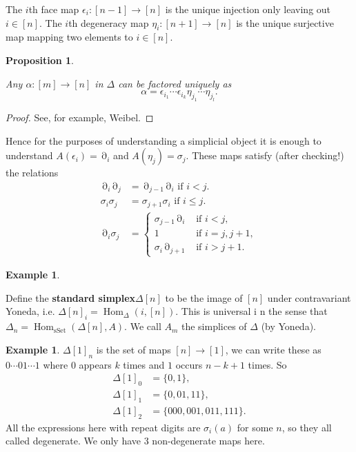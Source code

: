 \documentclass[10pt,]{book}
\newcommand{\lt}{<}
\newcommand{\gt}{>}
\newcommand{\terminology}[1]{\textbf{#1}}
\theoremstyle{plain}
\newtheorem{proposition}[theorem]{Proposition}
\theoremstyle{definition}
\newtheorem{example}[theorem]{Example}
\numberwithin{equation}{section}
\DeclareMathOperator{\Hom}{Hom}
\DeclareMathOperator{\sSet}{\text{sSet}}
\DeclareMathOperator{\dd}{\partial}
\begin{document}
          The \(i\)th face map \(\epsilon_i\colon[n-1] \to [n]\) is the unique injection only leaving out \(i \in [n]\).
          The \(i\)th degeneracy map \(\eta_i\colon [n+1] \to [n]\) is the unique surjective map mapping two elements to \(i\in [n]\).
\begin{proposition}\label{proposition-2}

            Any \(\alpha\colon [m] \to [n]\) in \(\Delta\) can be factored uniquely as
            \[
              \alpha = \epsilon_{i_1}\cdots \epsilon_{i_k}\eta_{j_1}\cdots \eta_{j_l}.
            \]\end{proposition}
\begin{proof}
See, for example, Weibel.\end{proof}
\par

          Hence for the purposes of understanding a simplicial object it is enough to understand \(A(\epsilon_i) = \dd_i\) and \(A(\eta_j) = \sigma_j\).
          These maps satisfy (after checking!) the relations
          \begin{align*}
\dd_i\dd_j &= \dd_{j-1}\dd_i \text{ if } i \lt j.\\
\sigma_i\sigma_j &= \sigma_{j+1}\sigma_i \text{ if } i \leq j.\\
\dd_i\sigma_j &= \begin{cases}\sigma_{j-1}\dd_i & \text{ if } i \lt j, \\ 1 &\text{ if } i=j,j+1,\\\sigma_i\dd_{j+1} &\text{ if }i \gt j + 1.\end{cases}
\end{align*}
\begin{example}\label{example-16}

            Define the \terminology{standard simplex}\(\Delta[n]\) to be the image of \([n]\) under contravariant Yoneda, i.e. \(\Delta[n]_i = \Hom_{\Delta}(i,[n])\).
            This is universal i n the sense that \(\Delta_n = \Hom_{\sSet}(\Delta[n], A)\).
            We call \(A_m\) the simplices of \(\Delta\) (by Yoneda).
          \end{example}
\begin{example}\label{example-17}
\(\Delta[1]_n\) is the set of maps \([n] \to [1]\), we can write these as \(0\cdots 0 1\cdots 1\) where \(0\) appears \(k\) times and \(1\) occurs \(n-k +1\) times.
            So
            \begin{align*}
\Delta[1]_0 &= \{0, 1\},\\
\Delta[1]_1 &= \{0, 01, 11\},\\
\Delta[1]_2 &= \{000, 001, 011, 111\}.
\end{align*}
            All the expressions here with repeat digits are \(\sigma_i(a)\) for some \(n\), so they all called degenerate.
            We only have 3 non-degenerate maps here.
            \end{example}
\typeout{************************************************}
\typeout{************************************************}
\end{document}
